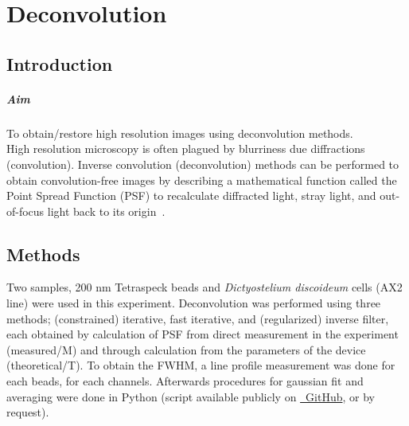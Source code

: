 
\chapter{Deconvolution}
\label{chp:Deconvolution}

\section{Introduction}

\paragraph{Aim} To obtain/restore high resolution images using deconvolution methods. 
\\

High resolution microscopy is often plagued by blurriness due diffractions (convolution). 
Inverse convolution (deconvolution) methods can be performed to obtain convolution-free images by describing a mathematical function called the Point Spread Function (PSF) to recalculate diffracted light, stray light, and out-of-focus light back to its origin~\cite{Lect10}.  


\section{Methods}

Two samples, 200 nm Tetraspeck beads and \textit{Dictyostelium discoideum} cells (AX2 line) were used in this experiment. 
Deconvolution was performed using three methods; (constrained) iterative, fast iterative, and (regularized) inverse filter, each obtained by calculation of PSF from direct measurement in the experiment (measured/M) and through calculation from the parameters of the device (theoretical/T). 
To obtain the FWHM, a line profile measurement was done for each beads, for each channels. 
Afterwards procedures for gaussian fit and averaging were done in \faPython Python (script available publicly on \href{https://github.com/howset/LightMicro}{\faGithub~GitHub}, or by request).

